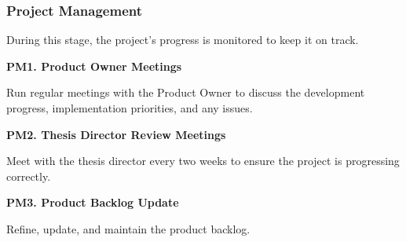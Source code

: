 \subsubsection{Project Management}

During this stage, the project’s progress is monitored to keep it on track.

\textbf{PM1. Product Owner Meetings}

Run regular meetings with the Product Owner to discuss the development progress, implementation priorities, and any issues.

\textbf{PM2. Thesis Director Review Meetings}

Meet with the thesis director every two weeks to ensure the project is progressing correctly.

\textbf{PM3. Product Backlog Update}

Refine, update, and maintain the product backlog.